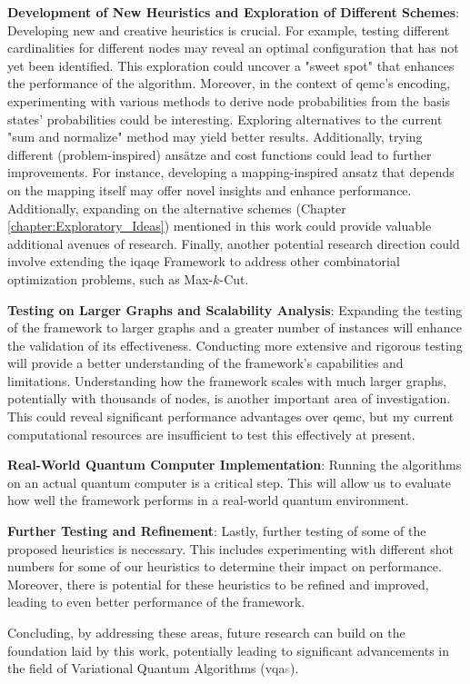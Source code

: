 \noindent\textbf{Development of New Heuristics and Exploration of Different Schemes}: Developing new and creative heuristics is crucial. For example, testing different cardinalities for different nodes may reveal an optimal configuration that has not yet been identified. This exploration could uncover a "sweet spot" that enhances the performance of the algorithm. Moreover, in the context of \acrshort{qemc}'s encoding, experimenting with various methods to derive node probabilities from the basis states' probabilities could be interesting. Exploring alternatives to the current "sum and normalize" method may yield better results. Additionally, trying different (problem-inspired) ansätze and cost functions could lead to further improvements. For instance, developing a mapping-inspired ansatz that depends on the mapping itself may offer novel insights and enhance performance. Additionally, expanding on the alternative schemes (Chapter \ref{chapter:Exploratory_Ideas}) mentioned in this work could provide valuable additional avenues of research. Finally, another potential research direction could involve extending the \acrshort{iqaqe} Framework to address other combinatorial optimization problems, such as Max-\(k\)-Cut.
\vspace{5mm}

\noindent\textbf{Testing on Larger Graphs and Scalability Analysis}: Expanding the testing of the framework to larger graphs and a greater number of instances will enhance the validation of its effectiveness. Conducting more extensive and rigorous testing will provide a better understanding of the framework's capabilities and limitations. Understanding how the framework scales with much larger graphs, potentially with thousands of nodes, is another important area of investigation. This could reveal significant performance advantages over \acrshort{qemc}, but my current computational resources are insufficient to test this effectively at present.
\vspace{5mm}

\noindent\textbf{Real-World Quantum Computer Implementation}: Running the algorithms on an actual quantum computer is a critical step. This will allow us to evaluate how well the framework performs in a real-world quantum environment.
\vspace{5mm}

\noindent\textbf{Further Testing and Refinement}: Lastly, further testing of some of the proposed heuristics is necessary. This includes experimenting with different shot numbers for some of our heuristics to determine their impact on performance. Moreover, there is potential for these heuristics to be refined and improved, leading to even better performance of the framework.
\vspace{5mm}

Concluding, by addressing these areas, future research can build on the foundation laid by this work, potentially leading to significant advancements in the field of Variational Quantum Algorithms (\acrshort{vqa}\textcolor{gray}{s}).


